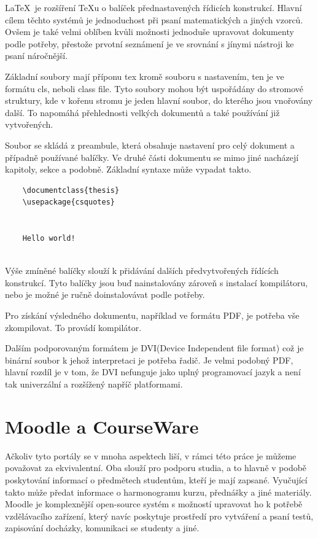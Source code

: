 	\LaTeX\ je rozšíření \TeX u o balíček přednastavených řídicích konstrukcí. Hlavní cílem těchto systémů je jednoduchost při psaní matematických a jiných vzorců. Ovšem je také velmi oblíben kvůli možnosti jednoduše upravovat dokumenty podle potřeby, přestože prvotní seznámení je ve srovnání s jínymi nástroji ke psaní náročnější.
	
	Základní soubory mají příponu tex kromě souboru s nastavením, ten je ve formátu cls, neboli class file. Tyto soubory mohou být uspořádány do stromové struktury, kde v kořenu stromu je jeden hlavní soubor, do kterého jsou vnořovány další. To napomáhá přehlednosti velkých dokumentů a také používání již vytvořených. 
	
	Soubor se skládá z preambule, která obsahuje nastavení pro celý dokument a případně používané balíčky. Ve druhé části dokumentu se mimo jiné nacházejí kapitoly, sekce a podobně. Základní syntaxe může vypadat takto.
	
	\begin{verbatim}
	\documentclass{thesis}
	\usepackage{csquotes}
	
	
	Hello world!
	
	\end{verbatim}
	
	Výše zmíněné balíčky slouží k přidávání dalších předvytvořených řídících konstrukcí. Tyto balíčky jsou buď nainstalovány zároveň s instalací kompilátoru, nebo je možné je ručně doinstalovávat podle potřeby. 
	
	Pro získání výsledného dokumentu, například ve formátu PDF, je potřeba vše zkompilovat. To provádí kompilátor. 
	
	Dalším podporovaným formátem je DVI(Device Independent file format) což je binární soubor k jehož interpretaci je potřeba řadič. Je velmi podobný PDF, hlavní rozdíl je v tom, že DVI nefunguje jako uplný programovací jazyk a není tak univerzální a rozšížený napříč platformami. 

\section{Moodle a CourseWare}
	Ačkoliv tyto portály se v mnoha aspektech liší, v rámci této práce je můžeme považovat za ekvivalentní. Oba slouží pro podporu studia, a to hlavně v podobě poskytování informací o předmětech studentům, kteří je mají zapsané. Vyučující takto může předat informace o harmonogramu kurzu, přednášky a jiné materiály. Moodle je komplexnější open-source systém s možností upravovat ho k potřebě vzdělávacího zařízení, který navíc poskytuje prostředí pro vytváření a psaní testů, zapisování docházky, komunikaci se studenty a jiné.

